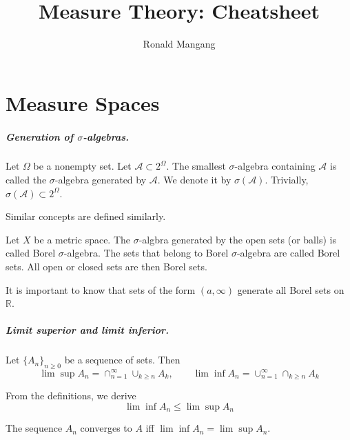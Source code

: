 \documentclass[12pt,english,oneside]{scrbook}
\numberwithin{equation}{chapter}
\theoremstyle{definition}
\theoremstyle{plain}
\begin{document}
\title{Measure Theory: Cheatsheet}
\author{Ronald Mangang}

\maketitle
\tableofcontents

\thispagestyle{empty}
\newpage
{}


\chapter{Measure Spaces}

\paragraph{Generation of $\sigma$-algebras.}

Let $\Omega$ be a nonempty set. Let $\mathcal{A}\subset 2^\Omega$. The smallest $\sigma$-algebra containing $\mathcal{A}$ is called the $\sigma$-algebra generated by $\mathcal{A}$. We denote it by $\sigma(\mathcal{A})$. Trivially, $\sigma(\mathcal{A})\subset 2^\Omega$.

Similar concepts are defined similarly.

Let $X$ be a metric space. The $\sigma$-algbra generated by the open sets (or balls) is called Borel $\sigma$-algebra. The sets that belong to Borel $\sigma$-algebra are called Borel sets. All open or closed sets are then Borel sets.

It is important to know that sets of the form $(a,\infty)$ generate all Borel sets on $\mathbb{R}$.

\paragraph{Limit superior and limit inferior.}

Let $\{A_n\}_{n\geq 0}$ be a sequence of sets. Then
\begin{equation}
  \lim \sup A_n = \cap_{n=1}^\infty \cup_{k\geq n} A_k, \hspace{2em}
  \lim \inf A_n = \cup_{n=1}^\infty \cap_{k\geq n} A_k
\end{equation}

From the definitions, we derive
\begin{equation}
  \lim \inf A_n \leq \lim \sup A_n
\end{equation}

The sequence ${A_n}$ converges to $A$ iff $\lim \inf A_n = \lim \sup A_n$.
\end{document}
